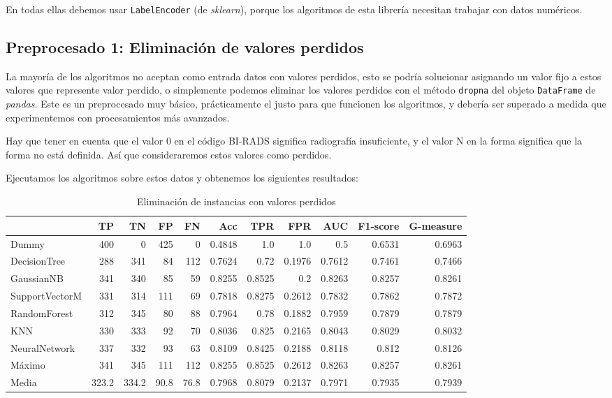 \documentclass{article}
\begin{document}
En todas ellas debemos usar \texttt{LabelEncoder} (de
\textit{sklearn}), porque los algoritmos de esta librería necesitan
trabajar con datos numéricos.

\subsection{Preprocesado 1: Eliminación de valores perdidos}

La mayoría de los algoritmos no aceptan como entrada datos con valores
perdidos, esto se podría solucionar asignando un valor fijo a estos
valores que represente valor perdido, o simplemente podemos eliminar
los valores perdidos con el método \texttt{dropna} del objeto
\texttt{DataFrame} de \textit{pandas}. Este es un preprocesado muy
básico, prácticamente el justo para que funcionen los algoritmos, y
debería ser superado a medida que experimentemos con procesamientos
más avanzados.

Hay que tener en cuenta que el valor 0 en el código BI-RADS significa
radiografía insuficiente, y el valor N en la forma significa que la
forma no está definida. Así que consideraremos estos valores como
perdidos.

Ejecutamos los algoritmos sobre estos datos y obtenemos los siguientes
resultados:

\begin{table}[H]
\centering
\caption{Eliminación de instancias con valores perdidos}
\label{tab:dropna}
\begin{tabular}{|lrrrrrrrrrr|}
\hline
 & TP & TN & FP & FN & Acc & TPR & FPR & AUC & F1-score & G-measure\\ \hline
Dummy & 400 & 0 & 425 & 0 & 0.4848 & 1.0 & 1.0 & 0.5 & 0.6531 & 0.6963\\
DecisionTree & 288 & 341 & 84 & 112 & 0.7624 & 0.72 & 0.1976 & 0.7612 & 0.7461 & 0.7466\\
GaussianNB & 341 & 340 & 85 & 59 & 0.8255 & 0.8525 & 0.2 & 0.8263 & 0.8257 & 0.8261\\
SupportVectorM & 331 & 314 & 111 & 69 & 0.7818 & 0.8275 & 0.2612 & 0.7832 & 0.7862 & 0.7872\\
RandomForest & 312 & 345 & 80 & 88 & 0.7964 & 0.78 & 0.1882 & 0.7959 & 0.7879 & 0.7879\\
KNN & 330 & 333 & 92 & 70 & 0.8036 & 0.825 & 0.2165 & 0.8043 & 0.8029 & 0.8032\\
NeuralNetwork & 337 & 332 & 93 & 63 & 0.8109 & 0.8425 & 0.2188 & 0.8118 & 0.812 & 0.8126\\ \hline
Máximo & 341 & 345 & 111 & 112 & 0.8255 & 0.8525 & 0.2612 & 0.8263 & 0.8257 & 0.8261\\
Media & 323.2 & 334.2 & 90.8 & 76.8 & 0.7968 & 0.8079 & 0.2137 & 0.7971 & 0.7935 & 0.7939\\
\hline
\end{tabular}
\end{table}
\end{document}
